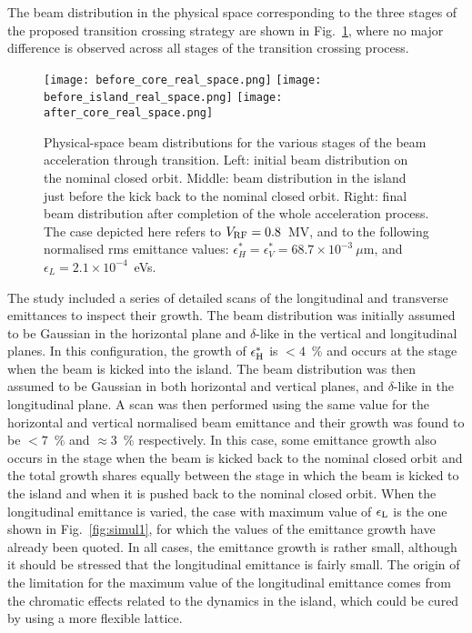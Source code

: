 \documentclass{article}
\begin{document}
The beam distribution in the physical space corresponding to the three stages of the proposed transition crossing strategy are shown in Fig.~\ref{fig:simul2}, where no major difference is observed across all stages of the transition crossing process.
%
\begin{figure}[htb]
\centering
  \texttt{[image: before\_core\_real\_space.png]}
  \texttt{[image: before\_island\_real\_space.png]}
  \texttt{[image: after\_core\_real\_space.png]}
  \caption{Physical-space beam distributions for the various stages of the beam acceleration through transition. Left: initial beam distribution on the nominal closed orbit. Middle: beam distribution in the island just before the kick back to the nominal closed orbit. Right: final beam distribution after completion of the whole acceleration process. The case depicted here refers to $V_{\rm RF}=0.8$~MV, and to the following normalised rms emittance values: $\epsilon^*_{H}=\epsilon^*_{V}=68.7 \times 10^{-3}~\mu$m, and $\epsilon_{L}=2.1 \times 10^{-4}$~eVs.}
\label{fig:simul2}
\end{figure}
%

The study included a series of detailed scans of the longitudinal and transverse emittances to inspect their growth. The beam distribution was initially assumed to be Gaussian in the horizontal plane and $\delta$-like in the  vertical and longitudinal planes. In this configuration, the growth of $\epsilon^*_{\rm H}$ is $< 4$~\% and occurs at the stage when the beam is kicked into the island. The beam distribution was then assumed to be Gaussian in both horizontal and vertical planes, and $\delta$-like in the longitudinal plane. A scan was then performed using the same value for the horizontal and vertical normalised beam emittance and their growth was found to be $< 7$~\% and $\approx 3$~\% respectively. In this case, some emittance growth also occurs in the stage when the beam is kicked back to the nominal closed orbit and the total growth shares equally between the stage in which the beam is kicked to the island and when it is pushed back to the nominal closed orbit. When the longitudinal emittance is varied, the case with maximum value of $\epsilon_{\rm L}$ is the one shown in Fig.~\ref{fig:simul1}, for which the values of the emittance growth have already been quoted. In all cases, the emittance growth is rather small, although it should be stressed that the longitudinal emittance is fairly small. The origin of the limitation for the maximum value of the longitudinal emittance comes from the chromatic effects related to the dynamics in the island, which could be cured by using a more flexible lattice.
%
\end{document}
